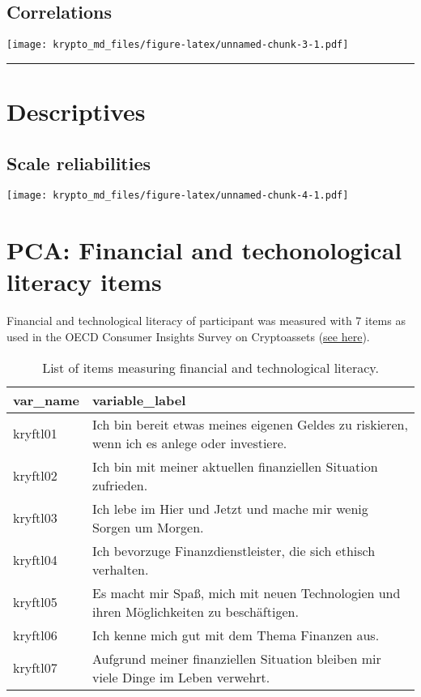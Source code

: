 \documentclass[doc]{apa7}
\begin{document}
\hypertarget{correlations}{%
\subsection{Correlations}\label{correlations}}

\texttt{[image: krypto\_md\_files/figure-latex/unnamed-chunk-3-1.pdf]}

\begin{center}\rule{0.5\linewidth}{0.5pt}\end{center}

\hypertarget{descriptives}{%
\section{Descriptives}\label{descriptives}}

\hypertarget{scale-reliabilities}{%
\subsection{Scale reliabilities}\label{scale-reliabilities}}

\texttt{[image: krypto\_md\_files/figure-latex/unnamed-chunk-4-1.pdf]}

\hypertarget{pca-financial-and-techonological-literacy-items}{%
\section{PCA: Financial and techonological literacy
items}\label{pca-financial-and-techonological-literacy-items}}

Financial and technological literacy of participant was measured with 7
items as used in the OECD Consumer Insights Survey on Cryptoassets
(\href{https://www.oecd.org/financial/education/consumer-insights-survey-on-cryptoassets.pdf}{see
here}).

\begin{table}

\caption{\label{tab:unnamed-chunk-5}List of items measuring financial and technological literacy.}
\centering
\begin{tabular}[t]{l|l}
\hline
var\_name & variable\_label\\
\hline
kryftl01 & Ich bin bereit etwas meines eigenen Geldes zu riskieren, wenn ich es anlege oder investiere.\\
\hline
kryftl02 & Ich bin mit meiner aktuellen finanziellen Situation zufrieden.\\
\hline
kryftl03 & Ich lebe im Hier und Jetzt und mache mir wenig Sorgen um Morgen.\\
\hline
kryftl04 & Ich bevorzuge Finanzdienstleister, die sich ethisch verhalten.\\
\hline
kryftl05 & Es macht mir Spaß, mich mit neuen Technologien und ihren Möglichkeiten zu beschäftigen.\\
\hline
kryftl06 & Ich kenne mich gut mit dem Thema Finanzen aus.\\
\hline
kryftl07 & Aufgrund meiner finanziellen Situation bleiben mir viele Dinge im Leben verwehrt.\\
\hline
\end{tabular}
\end{table}
\end{document}
